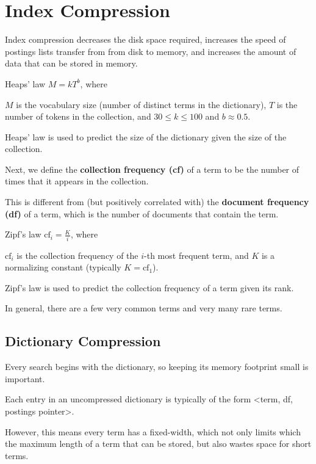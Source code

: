 \section{Index Compression}
Index compression decreases the disk space required, increases the speed of postings lists transfer from from disk to memory, and increases the amount of data that can be stored in memory.

\begin{defn}{Heaps' law}
    $M = kT^b$, where

    $M$ is the vocabulary size (number of distinct terms in the dictionary),
    $T$ is the number of tokens in the collection,
    and $30 \leq k \leq 100$ and $b \approx 0.5$.
\end{defn}

Heaps' law is used to predict the size of the dictionary given the size of the collection.

Next, we define the \textbf{collection frequency (cf)} of a term to be the number of times that it appears in the collection.

This is different from (but positively correlated with) the \textbf{document frequency (df)} of a term, which is the number of documents that contain the term.

\begin{defn}{Zipf's law}
    $\text{cf}_i = \frac{K}{i}$, where

    $\text{cf}_i$ is the collection frequency of the $i$-th most frequent term,
    and $K$ is a normalizing constant (typically $K = \text{cf}_1$).
\end{defn}

Zipf's law is used to predict the collection frequency of a term given its rank.

In general, there are a few very common terms and very many rare terms.

\subsection{Dictionary Compression}
Every search begins with the dictionary, so keeping its memory footprint small is important.

Each entry in an uncompressed dictionary is typically of the form <term, df, postings pointer>.

However, this means every term has a fixed-width, which not only limits which the maximum length of a term that can be stored, but also wastes space for short terms.

